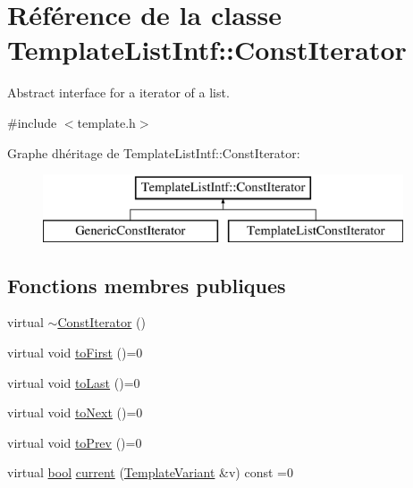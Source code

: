 \hypertarget{class_template_list_intf_1_1_const_iterator}{}\section{Référence de la classe Template\+List\+Intf\+:\+:Const\+Iterator}
\label{class_template_list_intf_1_1_const_iterator}


Abstract interface for a iterator of a list.  




{\ttfamily \#include $<$template.\+h$>$}

Graphe d\textquotesingle{}héritage de Template\+List\+Intf\+:\+:Const\+Iterator\+:\begin{figure}[H]
\begin{center}
\leavevmode
\includegraphics[height=2.000000cm]{class_template_list_intf_1_1_const_iterator}
\end{center}
\end{figure}
\subsection*{Fonctions membres publiques}
\begin{DoxyCompactItemize}
\item 
virtual \hyperlink{class_template_list_intf_1_1_const_iterator_a831a69d0d66057405396a89fe2371567}{$\sim$\+Const\+Iterator} ()
\item 
virtual void \hyperlink{class_template_list_intf_1_1_const_iterator_ab0d366c70210b05cf32f465d953d3152}{to\+First} ()=0
\item 
virtual void \hyperlink{class_template_list_intf_1_1_const_iterator_acf5b37615cb4544e1b0cb5717a127900}{to\+Last} ()=0
\item 
virtual void \hyperlink{class_template_list_intf_1_1_const_iterator_a8656b1ee10ba2625ba91eadb78f8faf7}{to\+Next} ()=0
\item 
virtual void \hyperlink{class_template_list_intf_1_1_const_iterator_a9e5ce362eb61eb772df5afefa5703510}{to\+Prev} ()=0
\item 
virtual \hyperlink{qglobal_8h_a1062901a7428fdd9c7f180f5e01ea056}{bool} \hyperlink{class_template_list_intf_1_1_const_iterator_a2832f9c90af4203e5ad9c3fff8dbb0ed}{current} (\hyperlink{class_template_variant}{Template\+Variant} \&v) const  =0
\end{DoxyCompactItemize}


